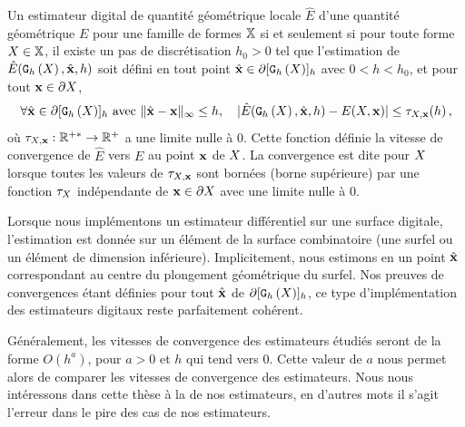 \begin{definition}{}
  \label{def:multigrid-convergence-local}
  Un estimateur digital de quantité géométrique locale $\hat{E}$ d'une quantité géométrique
  $E$  pour une famille de formes $\mathbb{X}$ si
  et seulement si pour toute forme $X \in \mathbb{X}$, il existe un pas de
  discrétisation $h_0 > 0$ tel que l'estimation de $\hat{E}(\mathtt{G}_{h}\left(X\right),\hat{\mathbf{x}},h)$
  soit défini en tout point $\hat{\mathbf{x}} \in \partial \lbrack \mathtt{G}_{h}\left(X\right) \rbrack_{h}$ avec $0 < h < h_0$,
  et pour tout $\mathbf{x} \in \partial X$,
  \begin{equation}
    \forall \hat{\mathbf{x}} \in \partial\lbrack \mathtt{G}_{h}\left(X\right) \rbrack_{h} \text{~avec~} \| \hat{\mathbf{x}} -\mathbf{x}\|_\infty
    \le h, \quad | \hat{E}(\mathtt{G}_{h}\left(X\right),\hat{\mathbf{x}},h) - E(X,\mathbf{x}) | \le \tau_{X,\mathbf{x}}(h) \,,
  \end{equation}
  où $\tau_{X,\mathbf{x}}: \mathbb{R}^{+*} \rightarrow \mathbb{R}^+$ a une limite
  nulle à $0$. Cette fonction définie la vitesse de convergence de $\hat{E}$
  vers $E$ au point $\mathbf{x}$ de $X$. La convergence est dite
   pour $X$ lorsque toutes les valeurs de
  $\tau_{X,\mathbf{x}}$ sont bornées (borne supérieure) par une fonction
  $\tau_{X}$ indépendante de $\mathbf{x} \in \partial X$ avec une limite nulle à $0$.
\end{definition}

Lorsque nous implémentons un estimateur différentiel sur une surface digitale,
l'estimation est donnée sur un élément de la surface combinatoire (une surfel ou
un élément de dimension inférieure). Implicitement, nous estimons en un point
$\hat{\mathbf{x}}$ correspondant au centre du plongement géométrique du surfel. Nos
preuves de convergences étant définies pour tout $\hat{\mathbf{x}}$ de $\partial
\lbrack \mathtt{G}_{h}\left(X\right) \rbrack_{h}$, ce type d'implémentation des estimateurs digitaux reste
parfaitement cohérent.

Généralement, les vitesses de convergence des estimateurs étudiés seront de la
forme $O(h^a)$, pour $a > 0$ et $h$ qui tend vers $0$. Cette valeur de $a$ nous
permet alors de comparer les vitesses de convergence des estimateurs. Nous nous
intéressons dans cette thèse à la 
de nos estimateurs, en d'autres mots il s'agit l'erreur dans le pire des cas de
nos estimateurs.

